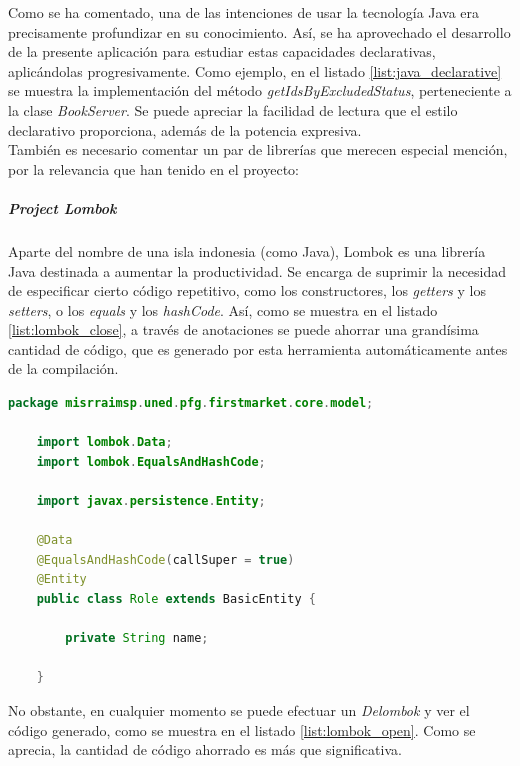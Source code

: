 \documentclass[a4paper]{article}
\begin{document}
	Como se ha comentado, una de las intenciones de usar la tecnología Java era precisamente profundizar en su conocimiento. Así, se ha aprovechado el desarrollo de la presente aplicación para estudiar estas capacidades declarativas, aplicándolas progresivamente. Como ejemplo, en el listado \ref{list:java_declarative} se muestra la implementación del método \emph{getIdsByExcludedStatus}, perteneciente a la clase \emph{BookServer}. Se puede apreciar la facilidad de lectura que el estilo declarativo proporciona, además de la potencia expresiva. 
	\\
	
	También es necesario comentar un par de librerías que merecen especial mención, por la relevancia que han tenido en el proyecto:

	\subparagraph{Project Lombok}
	Aparte del nombre de una isla indonesia (como Java), Lombok es una librería Java destinada a aumentar la productividad. Se encarga de suprimir la necesidad de especificar cierto código repetitivo, como los constructores, los \emph{getters} y los \emph{setters}, o los \emph{equals} y los \emph{hashCode}. Así, como se muestra en el listado \ref{list:lombok_close}, a través de anotaciones se puede ahorrar una grandísima cantidad de código, que es generado por esta herramienta automáticamente antes de la compilación.
	\\

	\begin{lstlisting}[language=Java,caption=Clase \emph{Role} usando las anotaciones Lombok,label=list:lombok_close]
	package misrraimsp.uned.pfg.firstmarket.core.model;
	
	import lombok.Data;
	import lombok.EqualsAndHashCode;
	
	import javax.persistence.Entity;
	
	@Data
	@EqualsAndHashCode(callSuper = true)
	@Entity
	public class Role extends BasicEntity {
	
		private String name;
	
	}
	\end{lstlisting}
	
	No obstante, en cualquier momento se puede efectuar un \emph{Delombok} y ver el código generado, como se muestra en el listado \ref{list:lombok_open}. Como se aprecia, la cantidad de código ahorrado es más que significativa.
	\\
	
\end{document}
